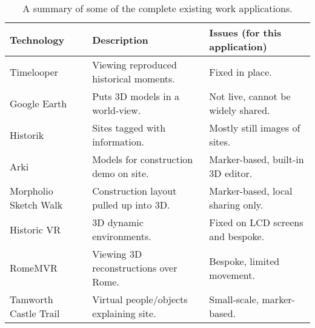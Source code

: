 \documentclass{article}
\begin{document}
\begin{table}[H]
\begin{tabular}{|l|l|l|}
\hline
\rowcolor[HTML]{EFEFEF} 
\textbf{Technology}   & \textbf{Description}                    & \textbf{Issues (for this application)} \\ \hline
Timelooper \cite{existing:timelooper}     & Viewing reproduced historical moments.  & Fixed in place.                        \\ \hline
Google Earth \cite{existing:googleearth}   & Puts 3D models in a world-view.         & Not live, cannot be widely shared.     \\ \hline
Historik \cite{existing:historik}       & Sites tagged with information.          & Mostly still images of sites.          \\ \hline
Arki \cite{existing:arki}           & Models for construction demo on site.   & Marker-based, built-in 3D editor.      \\ \hline
Morpholio Sketch Walk \cite{existing:morpholio} & Construction layout pulled up into 3D.  & Marker-based, local sharing only.      \\ \hline
Historic VR \cite{existing:historicvr}          & 3D dynamic environments.                & Fixed on LCD screens and bespoke.      \\ \hline
RomeMVR \cite{existing:romemvr}              & Viewing 3D reconstructions over Rome.   & Bespoke, limited movement.             \\ \hline
Tamworth Castle Trail \cite{existing:tamworth} & Virtual people/objects explaining site. & Small-scale, marker-based.             \\ \hline
\end{tabular}
\label{table:existingwork}
\caption{A summary of some of the complete existing work applications.}
\end{table}
\end{document}
